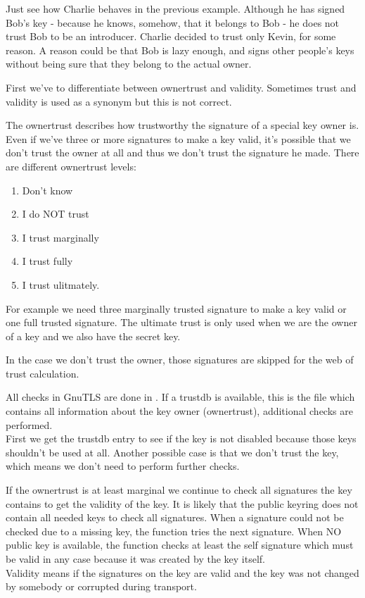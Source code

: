 Just see how Charlie behaves in the previous example. Although he has 
signed Bob's key - because he knows, somehow, that it belongs to Bob - 
he does not trust Bob to be an introducer. Charlie decided to trust only 
Kevin, for some reason. A reason could be that Bob is lazy enough, and 
signs other people's keys without being sure that they belong to the 
actual owner.

\par
First we've to differentiate between ownertrust and validity. Sometimes trust
and validity is used as a synonym but this is not correct.
\par
The ownertrust describes how trustworthy the signature of a special
key owner is. Even if we've three or more signatures to make a key valid,
it's possible that we don't trust the owner at all and thus we don't trust 
the signature he made. There are different ownertrust levels:
\begin{enumerate}
\item Don't know
\item I do NOT trust
\item I trust marginally
\item I trust fully
\item I trust ulitmately.
\end{enumerate}

For example we need three marginally trusted signature to make a key
valid or one full trusted signature. The ultimate trust is only used
when we are the owner of a key and we also have the secret key.
\par
In the case we don't trust the owner, those signatures are skipped
for the web of trust calculation.
\par
All checks in GnuTLS are done in . 
If a trustdb is available, this is the file which contains all information about the
key owner (ownertrust), additional checks are performed.
\\
First we get the trustdb entry to see if the key is not disabled because
those keys shouldn't be used at all. Another possible case is that we
don't trust the key, which means we don't need to perform further checks.
\par
If the ownertrust is at least marginal we continue to check all signatures
the key contains to get the validity of the key. It is likely that the
public keyring does not contain all needed keys to check all signatures.
When a signature could not be checked due to a missing key, the function 
tries the next signature. When NO public key is available, the function
checks at least the self signature which must be valid in any case because
it was created by the key itself.
\\
Validity means if the signatures on the key are valid and the key was not 
changed by somebody or corrupted during transport.

